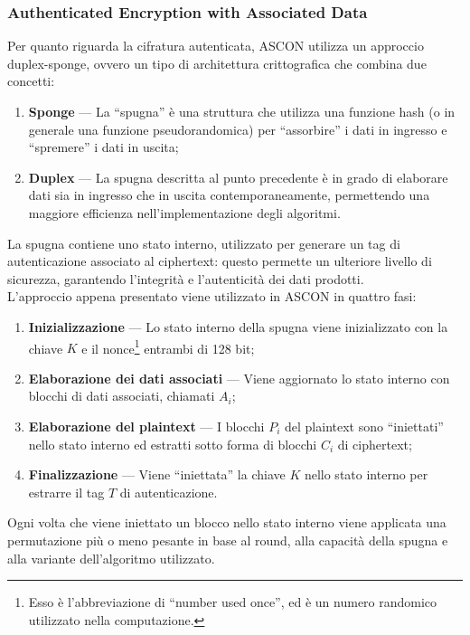 \subsubsection{Authenticated Encryption with Associated Data}

Per quanto riguarda la cifratura autenticata, ASCON utilizza un approccio duplex-sponge\cite{ascon-specification}, ovvero un tipo di architettura crittografica che combina due concetti:
\begin{enumerate}[label=\Roman*.]
    \item \textbf{Sponge} --- La ``spugna'' è una struttura che utilizza una funzione hash (o in generale una funzione pseudorandomica) per ``assorbire'' i dati in ingresso e ``spremere'' i dati in uscita;
    \item \textbf{Duplex} --- La spugna descritta al punto precedente è in grado di elaborare dati sia in ingresso che in uscita contemporaneamente, permettendo una maggiore efficienza nell'implementazione degli algoritmi.
\end{enumerate}
La spugna contiene uno stato interno, utilizzato per generare un tag di autenticazione associato al ciphertext: questo permette un ulteriore livello di sicurezza, garantendo l'integrità e l'autenticità dei dati prodotti. \\

\noindent L'approccio appena presentato viene utilizzato in ASCON in quattro fasi\cite{ascon-specification}:
\begin{enumerate}
    \item \textbf{Inizializzazione} --- Lo stato interno della spugna viene inizializzato con la chiave $K$ e il nonce\footnote{Esso è l'abbreviazione di ``number used once'', ed è un numero randomico utilizzato nella computazione.} entrambi di 128 bit;
    \item \textbf{Elaborazione dei dati associati} --- Viene aggiornato lo stato interno con blocchi di dati associati, chiamati $A_i$;
    \item \textbf{Elaborazione del plaintext} --- I blocchi $P_i$ del plaintext sono ``iniettati'' nello stato interno ed estratti sotto forma di blocchi $C_i$ di ciphertext;
    \item \textbf{Finalizzazione} --- Viene ``iniettata'' la chiave $K$ nello stato interno per estrarre il tag $T$ di autenticazione.
\end{enumerate}
Ogni volta che viene iniettato un blocco nello stato interno viene applicata una permutazione più o meno pesante in base al round, alla capacità della spugna e alla variante dell'algoritmo utilizzato. \\

